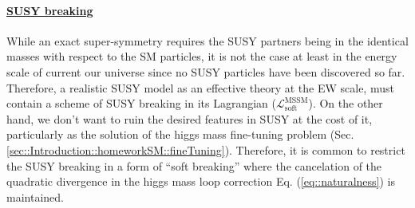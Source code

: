 \paragraph{\underline{SUSY breaking}}  \mbox{}
While an exact super-symmetry requires the SUSY partners being in the identical masses with respect to the SM particles, it is not the case at least in the energy scale of current our universe since no SUSY particles have been discovered so far. Therefore, a realistic SUSY model as an effective theory at the EW scale, must contain a scheme of SUSY breaking in its Lagrangian ($\mathcal{L}^{\mathrm{MSSM}}_{\mathrm{soft}}$). On the other hand, we don't want to ruin the desired features in SUSY at the cost of it, particularly as the solution of the higgs mass fine-tuning problem (Sec. \ref{sec::Introduction::homeworkSM::fineTuning}).
Therefore, it is common to restrict the SUSY breaking in a form of ``soft breaking'' where the cancelation of the quadratic divergence in the higgs mass loop correction Eq. (\ref{eq::naturalness}) is maintained. \\


